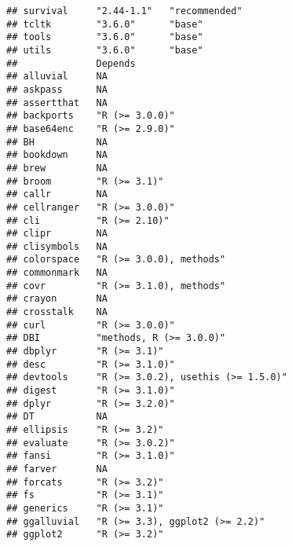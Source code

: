 \documentclass[]{book}
\begin{document}
\begin{verbatim}
## survival     "2.44-1.1"   "recommended"
## tcltk        "3.6.0"      "base"       
## tools        "3.6.0"      "base"       
## utils        "3.6.0"      "base"       
##              Depends                                          
## alluvial     NA                                               
## askpass      NA                                               
## assertthat   NA                                               
## backports    "R (>= 3.0.0)"                                   
## base64enc    "R (>= 2.9.0)"                                   
## BH           NA                                               
## bookdown     NA                                               
## brew         NA                                               
## broom        "R (>= 3.1)"                                     
## callr        NA                                               
## cellranger   "R (>= 3.0.0)"                                   
## cli          "R (>= 2.10)"                                    
## clipr        NA                                               
## clisymbols   NA                                               
## colorspace   "R (>= 3.0.0), methods"                          
## commonmark   NA                                               
## covr         "R (>= 3.1.0), methods"                          
## crayon       NA                                               
## crosstalk    NA                                               
## curl         "R (>= 3.0.0)"                                   
## DBI          "methods, R (>= 3.0.0)"                          
## dbplyr       "R (>= 3.1)"                                     
## desc         "R (>= 3.1.0)"                                   
## devtools     "R (>= 3.0.2), usethis (>= 1.5.0)"               
## digest       "R (>= 3.1.0)"                                   
## dplyr        "R (>= 3.2.0)"                                   
## DT           NA                                               
## ellipsis     "R (>= 3.2)"                                     
## evaluate     "R (>= 3.0.2)"                                   
## fansi        "R (>= 3.1.0)"                                   
## farver       NA                                               
## forcats      "R (>= 3.2)"                                     
## fs           "R (>= 3.1)"                                     
## generics     "R (>= 3.1)"                                     
## ggalluvial   "R (>= 3.3), ggplot2 (>= 2.2)"                   
## ggplot2      "R (>= 3.2)"                                     

\end{verbatim}
\end{document}
